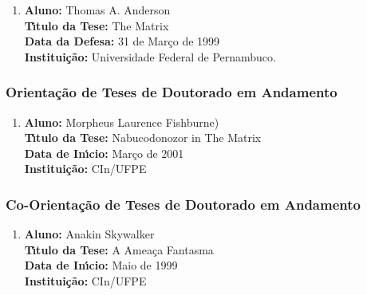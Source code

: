 \documentclass[a4paper,oneside,10pt]{article}
\begin{document}
\begin{enumerate}
\renewcommand{\labelenumi}{{\large\bfseries\arabic{enumi}.}}

\item       \textbf{Aluno:} Thomas A. Anderson \mbox{}\\
            \textbf{T\'{\i}tulo da Tese:} The Matrix \\
            \textbf{Data da Defesa:} 31 de Março de 1999 \\
            \textbf{Institui\c{c}\~{a}o:} Universidade Federal de Pernambuco.

\end{enumerate}


\subsubsection{Orienta\c{c}\~{a}o de Teses de Doutorado em Andamento}
\vspace{0.3cm}

\begin{enumerate}
\renewcommand{\labelenumi}{{\large\bfseries\arabic{enumi}.}}

\item       \textbf{Aluno:} Morpheus Laurence Fishburne) \mbox{} \\
            \textbf{T\'{\i}tulo da Tese:} Nabucodonozor in The Matrix \\
            \textbf{Data de In\'{\i}cio:} Mar\c{c}o de 2001 \\
            \textbf{Institui\c{c}\~{a}o:} CIn/UFPE

\end{enumerate}


\subsubsection{Co-Orienta\c{c}\~{a}o de Teses de Doutorado em Andamento}
\vspace{0.3cm}

\begin{enumerate}
\renewcommand{\labelenumi}{{\large\bfseries\arabic{enumi}.}}

\item       \textbf{Aluno:} Anakin Skywalker \mbox{}\\
            \textbf{T\'{\i}tulo da Tese:} A Ameaça Fantasma \\
            \textbf{Data de In\'{\i}cio:} Maio de 1999 \\
            \textbf{Institui\c{c}\~{a}o:} CIn/UFPE

\end{enumerate}
\end{document}
